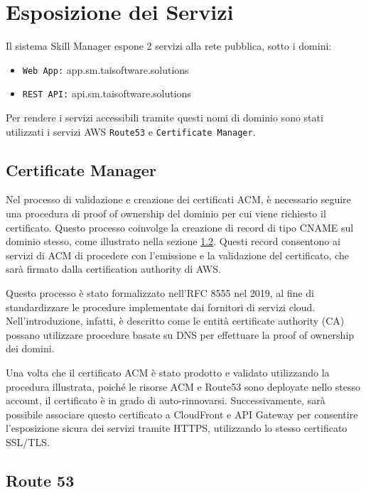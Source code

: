 \section{Esposizione dei Servizi}
\label{sec:esposizione_dei_servizi}
Il sistema Skill Manager espone 2 servizi alla rete pubblica, sotto i domini:
\begin{itemize}
    \item \texttt{Web App:}     app.sm.taisoftware.solutions
    \item \texttt{REST API:}		api.sm.taisoftware.solutions
\end{itemize}

Per rendere i servizi accessibili tramite questi nomi di dominio sono stati utilizzati i servizi AWS \texttt{Route53} e \texttt{Certificate Manager}.

\vspace{0.3cm}

\subsection{Certificate Manager}

Nel processo di validazione e creazione dei certificati ACM, è necessario seguire una procedura di proof of ownership del dominio per cui viene richiesto il certificato. Questo processo coinvolge la creazione di record di tipo CNAME sul dominio stesso, come illustrato nella sezione \ref{route53_config}. Questi record consentono ai servizi di ACM di procedere con l'emissione e la validazione del certificato, che sarà firmato dalla certification authority di AWS.

Questo processo è stato formalizzato nell'RFC 8555 \cite{rfc8555} nel 2019, al fine di standardizzare le procedure implementate dai fornitori di servizi cloud.
Nell'introduzione, infatti, è descritto come le entità certificate authority (CA) possano utilizzare procedure basate su DNS per effettuare la proof of ownership dei domini.

Una volta che il certificato ACM è stato prodotto e validato utilizzando la procedura illustrata, poiché le risorse ACM e Route53 sono deployate nello stesso account, il certificato è in grado di auto-rinnovarsi. Successivamente, sarà possibile associare questo certificato a CloudFront e API Gateway per consentire l'esposizione sicura dei servizi tramite HTTPS, utilizzando lo stesso certificato SSL/TLS.

\vspace{0.3cm}
\subsection{Route 53}
\label{route53_config}

